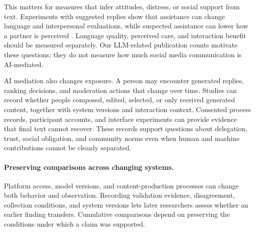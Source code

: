 This matters for measures that infer attitudes, distress, or social support from text. Experiments with suggested replies show that assistance can change language and interpersonal evaluations, while suspected assistance can lower how a partner is perceived \citep{hohenstein2023}. Language quality, perceived care, and interaction benefit should be measured separately. Our LLM-related publication counts motivate these questions; they do not measure how much social media communication is AI-mediated.

AI mediation also changes exposure. A person may encounter generated replies, ranking decisions, and moderation actions that change over time. Studies can record whether people composed, edited, selected, or only received generated content, together with system versions and interaction context. Consented process records, participant accounts, and interface experiments can provide evidence that final text cannot recover. These records support questions about delegation, trust, social obligation, and community norms even when human and machine contributions cannot be cleanly separated.

\paragraph{Preserving comparisons across changing systems.}
Platform access, model versions, and content-production processes can change both behavior and observation. Recording validation evidence, disagreement, collection conditions, and system versions lets later researchers assess whether an earlier finding transfers. Cumulative comparisons depend on preserving the conditions under which a claim was supported.
